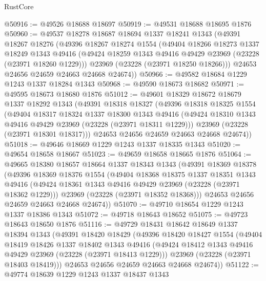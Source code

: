 \begin{lexlean}{RustCore}
\begin{coremodule}
@50916 := @49526 @18688 @18697
@50919 := @49531 @18688 @18695 @1876
@50960 := @49537
    @18278
    @18687
    @18694
    @1337
    @18241
    @1343
    (@49391
      @18267
      @18276
      (@49396
        @18267
        @18274
        @1554
        (@49404
          @18266
          @18273
          @1337
          @18249
          @1343
          @49416
          (@49424 @18259 @1343 @49416 @49429 @23969 (@23228 (@23971 @18260 @1229)))
          @23969
          (@23228 (@23971 @18250 @18266)))
        @24653
        @24656
        @24659
        @24663
        @24668
        @24674))
@50966 := @49582 @18684 @1229 @1243 @1337 @18284 @1343
@50968 := @49590 @18673 @18682
@50971 := @49595 @18673 @18680 @1876
@51012 := @49601
    @18329
    @18672
    @18679
    @1337
    @18292
    @1343
    (@49391
      @18318
      @18327
      (@49396
        @18318
        @18325
        @1554
        (@49404
          @18317
          @18324
          @1337
          @18300
          @1343
          @49416
          (@49424 @18310 @1343 @49416 @49429 @23969 (@23228 (@23971 @18311 @1229)))
          @23969
          (@23228 (@23971 @18301 @18317)))
        @24653
        @24656
        @24659
        @24663
        @24668
        @24674))
@51018 := @49646 @18669 @1229 @1243 @1337 @18335 @1343
@51020 := @49654 @18658 @18667
@51023 := @49659 @18658 @18665 @1876
@51064 := @49665
    @18380
    @18657
    @18664
    @1337
    @18343
    @1343
    (@49391
      @18369
      @18378
      (@49396
        @18369
        @18376
        @1554
        (@49404
          @18368
          @18375
          @1337
          @18351
          @1343
          @49416
          (@49424 @18361 @1343 @49416 @49429 @23969 (@23228 (@23971 @18362 @1229)))
          @23969
          (@23228 (@23971 @18352 @18368)))
        @24653
        @24656
        @24659
        @24663
        @24668
        @24674))
@51070 := @49710 @18654 @1229 @1243 @1337 @18386 @1343
@51072 := @49718 @18643 @18652
@51075 := @49723 @18643 @18650 @1876
@51116 := @49729
    @18431
    @18642
    @18649
    @1337
    @18394
    @1343
    (@49391
      @18420
      @18429
      (@49396
        @18420
        @18427
        @1554
        (@49404
          @18419
          @18426
          @1337
          @18402
          @1343
          @49416
          (@49424 @18412 @1343 @49416 @49429 @23969 (@23228 (@23971 @18413 @1229)))
          @23969
          (@23228 (@23971 @18403 @18419)))
        @24653
        @24656
        @24659
        @24663
        @24668
        @24674))
@51122 := @49774 @18639 @1229 @1243 @1337 @18437 @1343

\end{coremodule}
\end{lexlean}
